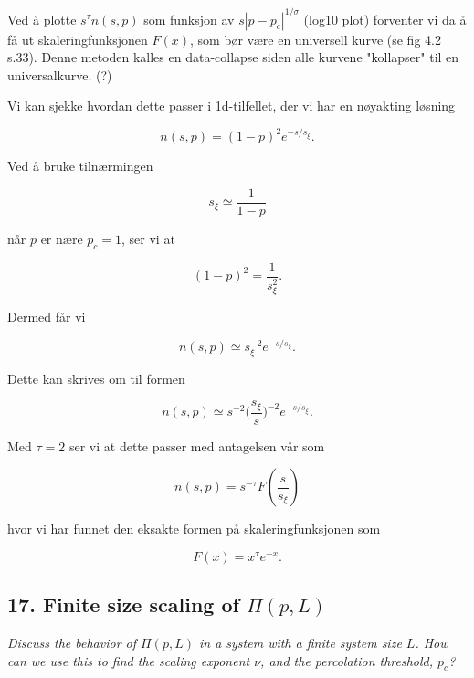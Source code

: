 \documentclass[a4paper,10pt]{article}
\begin{document}
Ved å plotte $s^{\tau}n(s,p)$ som funksjon av $s|p-p_c|^{1/\sigma}$ (log10 plot) forventer vi da å få ut skaleringfunksjonen $F(x)$, som bør være en universell kurve (se fig 4.2 s.33). Denne metoden kalles en data-collapse siden alle kurvene "kollapser" til en universalkurve. (?)

Vi kan sjekke hvordan dette passer i 1d-tilfellet, der vi har en nøyakting løsning

\begin{equation}
 n(s,p) = (1-p)^2e^{-s/s_{\xi}}.
\end{equation}

Ved å bruke tilnærmingen 

\begin{equation}
 s_{\xi} \simeq \frac{1}{1-p}
\end{equation}

når $p$ er nære $p_c=1$, ser vi at

\begin{equation}
 (1-p)^2 = \frac{1}{s_{\xi}^2}.
\end{equation}

Dermed får vi 

\begin{equation}
 n(s,p) \simeq s_{\xi}^{-2}e^{-s/s_{\xi}}.
\end{equation}

Dette kan skrives om til formen

\begin{equation}
 n(s,p) \simeq s^{-2}\bigg(\frac{s_{\xi}}{s}\bigg)^{-2}e^{-s/s_{\xi}}.
\end{equation}

Med $\tau=2$ ser vi at dette passer med antagelsen vår som

\begin{equation}
 n(s,p)=s^{-\tau}F(\frac{s}{s_{\xi}})
\end{equation}

hvor vi har funnet den eksakte formen på skaleringfunksjonen som

\begin{equation}
 F(x) = x^{\tau}e^{-x}.
\end{equation}




\subsection*{17. Finite size scaling of $\Pi(p,L)$}
\textit{Discuss the behavior of $\Pi(p, L)$ in a system with a finite system size $L$. How
can we use this to find the scaling exponent $\nu$, and the percolation threshold,
$p_c$?}
\end{document}
